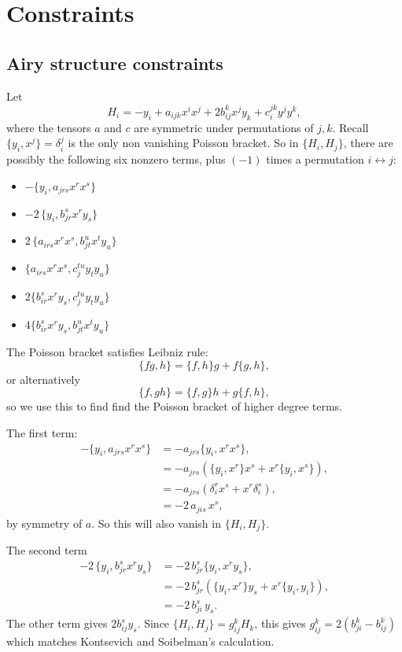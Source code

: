 \chapter{Constraints}
\section{Airy structure constraints}
\label{appendix:airy}
    Let
    \[ H_i = -y_i + a_{ijk} x^i x^j + 2 b_{ij}^k x^j y_k + c_i^{jk} y^j y^k, \]
    where the tensors \( a\) and \(c\) are symmetric under permutations of \(j,k\). Recall \( \{ y_i , x^j \} = \delta_i^j \) is the only non vanishing Poisson bracket. So in \( \{ H_i, H_j \} \), there are possibly the following six nonzero terms, plus \((-1)\) times a permutation \( i \leftrightarrow j \):
    \begin{itemize}
        \item \( -\{  y_i, a_{jrs} x^r x^s \}\) 
        \item \( -2\,\{  y_i , b_{jr}^s x^r y_s \} \)
        \item \( 2 \, \{ a_{irs} x^r x^s, b_{jt}^{u} x^t y_u \} \)
        \item \(  \{ a_{irs} x^r x^s, c_{j}^{t u} y_t y_u \} \)
        \item \(2 \{ b_{ir}^s x^r y_s , c_{j}^{t u} y_t y_u \} \)
        \item \(4 \{ b_{ir}^s x^r y_s ,b_{jt}^u x^t y_u\} \)
    \end{itemize}

    The Poisson bracket satisfies Leibniz rule: 
    \[ \{ f g  , h \}  = \{ f, h \} g + f \{g,h\}, \] 
    or alternatively  
    \[ \{ f , g h \} = \{ f,g\} h + g \{ f , h\}, \]
    so we use this to find find the Poisson bracket of higher degree terms.
    
    The first term:
    \begin{align*}
      -\{  y_i, a_{jrs} x^r x^s \}   & = -a_{jrs} \{ y_i, x^r x^s  \} ,\\
                                     &= -a_{jrs} \left( \{ y_i, x^r\} x^s + x^r \{ y_i, x^s \} \right) ,\\ 
                                     &= - a_{jrs} \left( \delta_i^r x^s + x^r \delta^s_i \right) ,\\
                                     &= - 2 \, a_{jis} \, x^s,
    \end{align*}
    by symmetry of \(a\). So this will also vanish in \( \{ H_i, H_j \} \).
    
    The second term
    \begin{align*}
        -2\,\{  y_i , b_{jr}^s x^r y_s \} &= -2 \, b_{jr}^s \{y_i, x^r y_s\}, \\
                                          &= -2 \, b_{jr}^s \left( \{y_i, x^r\}  y_s + x^r \{ y_i ,y_i\} \right), \\
                                          & = -2 \, b_{ji}^s \, y_s.
    \end{align*}
    The other term gives \(  2 b_{ij}^s y_s \).  Since \( \{ H_i , H_j \} = g_{ij}^k H_k \), this gives
    \( g_{ij}^k = 2 \left( b_{ji}^k - b_{i j}^k\right) \) which matches Kontsevich and Soibelman's calculation. 
    
